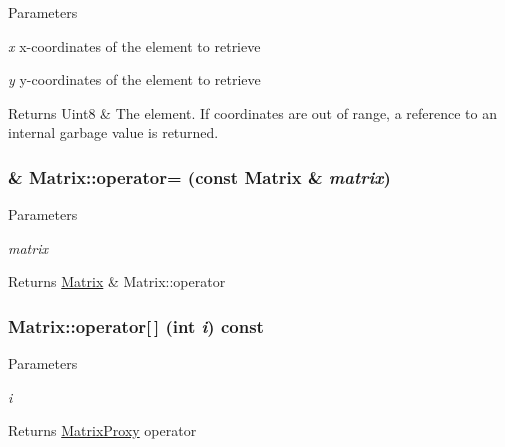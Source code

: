 \begin{DoxyParams}{Parameters}
\item[{\em x}]x-\/coordinates of the element to retrieve \item[{\em y}]y-\/coordinates of the element to retrieve \end{DoxyParams}
\begin{DoxyReturn}{Returns}
Uint8 \& The element. If coordinates are out of range, a reference to an internal garbage value is returned. 
\end{DoxyReturn}
\hypertarget{classMatrix_a45e4814b752129bed1f1316632f8543a}{
\subsubsection[{operator=}]{ \& Matrix::operator= (const {\bf Matrix} \& {\em matrix})}}
\label{classMatrix_a45e4814b752129bed1f1316632f8543a}

\begin{DoxyParams}{Parameters}
\item[{\em matrix}]\end{DoxyParams}
\begin{DoxyReturn}{Returns}
\hyperlink{classMatrix}{Matrix} \& Matrix::operator 
\end{DoxyReturn}
\hypertarget{classMatrix_ab54bf109f85ced0472a7e0c03d16471c}{
\subsubsection[{operator[]}]{ Matrix::operator\mbox{[}$\,$\mbox{]} (int {\em i}) const}}
\label{classMatrix_ab54bf109f85ced0472a7e0c03d16471c}

\begin{DoxyParams}{Parameters}
\item[{\em i}]\end{DoxyParams}
\begin{DoxyReturn}{Returns}
\hyperlink{classMatrix_1_1MatrixProxy}{MatrixProxy} operator 
\end{DoxyReturn}


